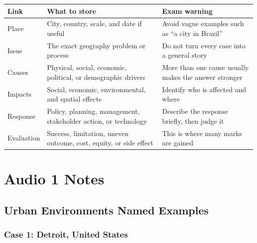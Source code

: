 \documentclass[11pt,a4paper]{article}
\begin{document}
\begin{tabularx}{\textwidth}{L{0.18\textwidth}Y Y}
\toprule
\textbf{Link} & \textbf{What to store} & \textbf{Exam warning} \\
\midrule
Place & City, country, scale, and date if useful & Avoid vague examples such
as ``a city in Brazil'' \\
Issue & The exact geography problem or process & Do not turn every case into a
general story \\
Causes & Physical, social, economic, political, or demographic drivers & More
than one cause usually makes the answer stronger \\
Impacts & Social, economic, environmental, and spatial effects & Identify who
is affected and where \\
Response & Policy, planning, management, stakeholder action, or technology &
Describe the response briefly, then judge it \\
Evaluation & Success, limitation, uneven outcome, cost, equity, or side effect
& This is where many marks are gained \\
\bottomrule
\end{tabularx}

\section{Audio 1 Notes}

\subsection{Urban Environments Named Examples}

\subsubsection{Case 1: Detroit, United States}
\end{document}
